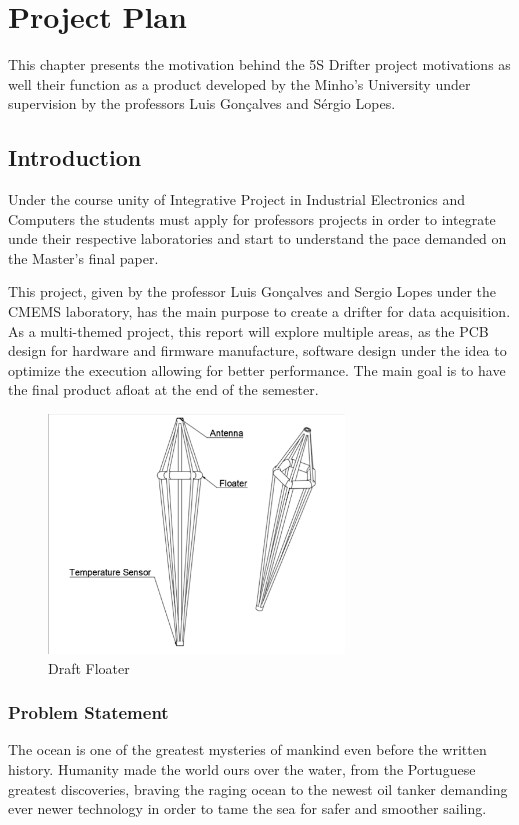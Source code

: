 \chapter{Project Plan}
This chapter presents the motivation behind the 5S Drifter project motivations as well their function as a product developed 
by the Minho's University under supervision by the professors Luis Gonçalves and Sérgio Lopes.
\section{Introduction}
\label{sec:Introduction}
Under the course unity of Integrative Project in Industrial Electronics and Computers the students must
apply for professors projects in order to integrate unde their respective laboratories and start to understand the pace
demanded on the Master's final paper.

This project, given by the professor Luis Gonçalves and Sergio Lopes under the CMEMS laboratory,
has the main purpose to create a drifter for data acquisition. As a multi-themed project, this report will
explore multiple areas, as the PCB design for hardware and firmware manufacture, software design under the idea to optimize
the execution allowing for better performance. The main goal is to have the final product afloat at the end of the semester.

\begin{figure}[H]
    \centering
    \includegraphics[width=0.7\textwidth]{images/diagrams/shell/unnamed.png}  %
    \caption{Draft Floater}
    \label{fig:Draft Floater}        
\end{figure}

\subsection{Problem Statement}
\label{sec:Problem Statement}
The ocean is one of the greatest mysteries of mankind even before the written history. Humanity made the world ours over the water, 
from the Portuguese greatest discoveries, braving the raging ocean to the newest oil tanker demanding ever newer technology
in order to tame the sea for safer and smoother sailing.

